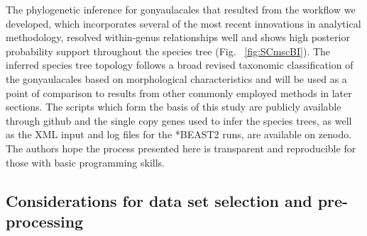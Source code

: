 \documentclass[fleqn,10pt,lineno]{wlpeerj} %
\begin{document}
The phylogenetic inference for gonyaulacales that resulted from the workflow we developed, which incorporates several of the most recent innovations in analytical methodology, resolved within-genus relationships well and shows high posterior probability support throughout the species tree (Fig. ~\ref{fig:SCmscBI}). 
The inferred species tree topology follows a broad revised taxonomic classification of the gonyaulacales based on morphological characteristics \cite{hoppenrath2017dinoflagellate} and will be used as a point of comparison to results from other commonly employed methods in later sections. 
The scripts which form the basis of this study are publicly available through github and the single copy genes used to infer the species trees, as well as the XML input and log files for the *BEAST2 runs, are available on zenodo. 
The authors hope the process presented here is transparent and reproducible for those with basic programming skills. 

\subsection*{Considerations for data set selection and pre-processing}
\end{document}
